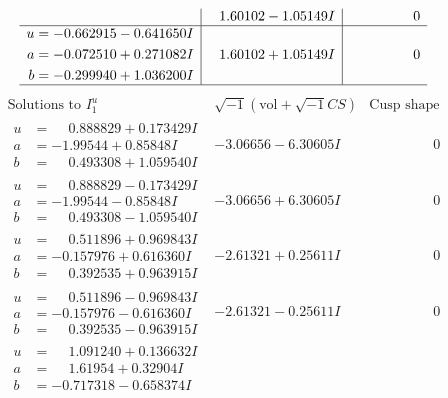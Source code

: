 \documentclass[1p]{elsarticle_modified}
\theoremstyle{definition}
\newcommand{\I}{\sqrt{-1}}
\begin{document}
$$\begin{array}{c|c|c}
 & \phantom{-}1.60102 - 1.05149 I & \phantom{-0.000000 } 0 \\ \hline\begin{aligned}
u &= -0.662915 - 0.641650 I \\
a &= -0.072510 + 0.271082 I \\
b &= -0.299940 + 1.036200 I\end{aligned}
 & \phantom{-}1.60102 + 1.05149 I & \phantom{-0.000000 } 0\\
 \hline 
 \end{array}$$\newpage$$\begin{array}{c|c|c}  
\text{Solutions to }I^u_{1}& \I (\text{vol} + \sqrt{-1}CS) & \text{Cusp shape}\\
 \hline 
\begin{aligned}
u &= \phantom{-}0.888829 + 0.173429 I \\
a &= -1.99544 + 0.85848 I \\
b &= \phantom{-}0.493308 + 1.059540 I\end{aligned}
 & -3.06656 - 6.30605 I & \phantom{-0.000000 } 0 \\ \hline\begin{aligned}
u &= \phantom{-}0.888829 - 0.173429 I \\
a &= -1.99544 - 0.85848 I \\
b &= \phantom{-}0.493308 - 1.059540 I\end{aligned}
 & -3.06656 + 6.30605 I & \phantom{-0.000000 } 0 \\ \hline\begin{aligned}
u &= \phantom{-}0.511896 + 0.969843 I \\
a &= -0.157976 + 0.616360 I \\
b &= \phantom{-}0.392535 + 0.963915 I\end{aligned}
 & -2.61321 + 0.25611 I & \phantom{-0.000000 } 0 \\ \hline\begin{aligned}
u &= \phantom{-}0.511896 - 0.969843 I \\
a &= -0.157976 - 0.616360 I \\
b &= \phantom{-}0.392535 - 0.963915 I\end{aligned}
 & -2.61321 - 0.25611 I & \phantom{-0.000000 } 0 \\ \hline\begin{aligned}
u &= \phantom{-}1.091240 + 0.136632 I \\
a &= \phantom{-}1.61954 + 0.32904 I \\
b &= -0.717318 - 0.658374 I\end{aligned}

\end{array}$$
\end{document}
